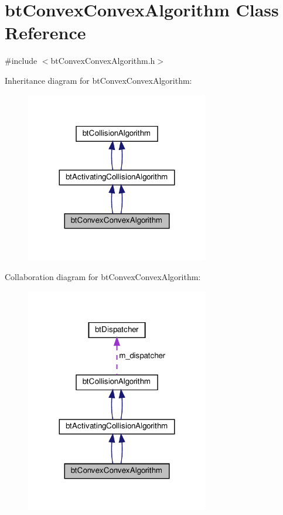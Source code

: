 \hypertarget{classbtConvexConvexAlgorithm}{}\section{bt\+Convex\+Convex\+Algorithm Class Reference}
\label{classbtConvexConvexAlgorithm}


{\ttfamily \#include $<$bt\+Convex\+Convex\+Algorithm.\+h$>$}



Inheritance diagram for bt\+Convex\+Convex\+Algorithm\+:
\nopagebreak
\begin{figure}[H]
\begin{center}
\leavevmode
\includegraphics[width=227pt]{classbtConvexConvexAlgorithm__inherit__graph}
\end{center}
\end{figure}


Collaboration diagram for bt\+Convex\+Convex\+Algorithm\+:
\nopagebreak
\begin{figure}[H]
\begin{center}
\leavevmode
\includegraphics[width=227pt]{classbtConvexConvexAlgorithm__coll__graph}
\end{center}
\end{figure}
